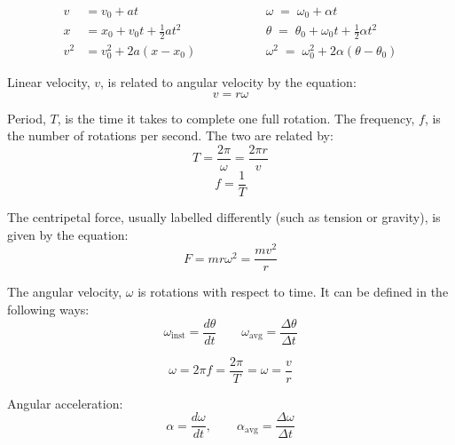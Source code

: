 \begin{center}
    \begin{align}
      v &= v_0 + a t 
      &\qquad\qquad&
      \omega \;=\; \omega_0 + \alpha t \\[4pt]
      x &= x_0 + v_0 t + \tfrac12 a t^{2} 
      &&
      \theta \;=\; \theta_0 + \omega_0 t + \tfrac12 \alpha t^{2} \\[4pt]
      v^{2} &= v_0^{2} + 2a\!\left(x - x_0\right) 
      &&
      \omega^{2} \;=\; \omega_0^{2} + 2\alpha\!\left(\theta - \theta_0\right)
    \end{align}
\end{center}

Linear velocity, $v$, is related to angular velocity by the equation:
$$v = r \omega$$    

Period, $T$, is the time it takes to complete one full rotation. The frequency, $f$, is the number of rotations per second. The two are related by:
$$T = \frac{2\pi}{\omega} = \frac{2\pi r}{v}$$
$$f = \frac{1}{T}$$

The centripetal force, usually labelled differently (such as tension or gravity), is given by the equation:
$$F = m r \omega^2 = \frac{m v^2}{r}$$


The angular velocity, $\omega$ is rotations with respect to time. It can be defined in the following ways:
\[
  {\omega_{\text{inst}} = \frac{d\theta}{dt}}
  \qquad
  {\omega_{\text{avg}} = \frac{\Delta\theta}{\Delta t}}
\]

\[
  {\omega = 2\pi f = \frac{2\pi}{T} = \omega = \frac{v}{r}}
\]

Angular acceleration:
\[
\alpha = \frac{d\omega}{dt}, \qquad
\alpha_{\text{avg}} = \frac{\Delta\omega}{\Delta t}
\]